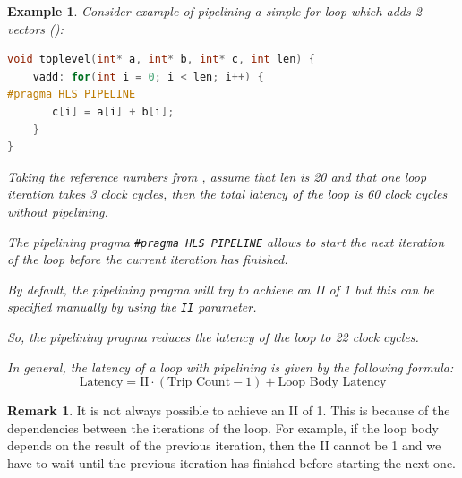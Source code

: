 \documentclass[a4paper, twoside]{report}
\newtheorem{exa}{Example}[section]
\theoremstyle{definition}
\newtheorem{remark}[theorem]{Remark}
\numberwithin{equation}{section}
\begin{document}
\begin{exa}
    Consider example of pipelining a simple for loop which adds 2 vectors (\cite{AMD2023Pipelining}):
    \begin{lstlisting}[language=c++,numbers=none]
void toplevel(int* a, int* b, int* c, int len) {
	vadd: for(int i = 0; i < len; i++) {
#pragma HLS PIPELINE
	   c[i] = a[i] + b[i];
	}
}
\end{lstlisting}

    Taking the reference numbers from \cite{AMD2023Pipelining},
    assume that len is 20 and that one loop iteration takes 3 clock cycles,
    then the total latency of the loop is 60 clock cycles without pipelining.

    The pipelining pragma \texttt{\#pragma HLS PIPELINE} allows to start
    the next iteration of the loop before the current iteration has finished.

    By default, the pipelining pragma will try to achieve an II of 1 but this
    can be specified manually by using the \texttt{II} parameter.

    So, the pipelining pragma reduces the latency of the loop to 22 clock cycles.

    In general, the latency of a loop with pipelining is given by the following formula:
    \begin{equation}
        \text{Latency} = \text{II} \cdot (\text{Trip Count} - 1) + \text{Loop Body Latency}
    \end{equation}
\end{exa}

\begin{remark}
    It is not always possible to achieve an II of 1.
    This is because of the dependencies between the iterations of the loop.
    For example, if the loop body depends on the result of the previous iteration,
    then the II cannot be 1 and we have to wait until the previous iteration has finished
    before starting the next one.
\end{remark}

\end{document}
